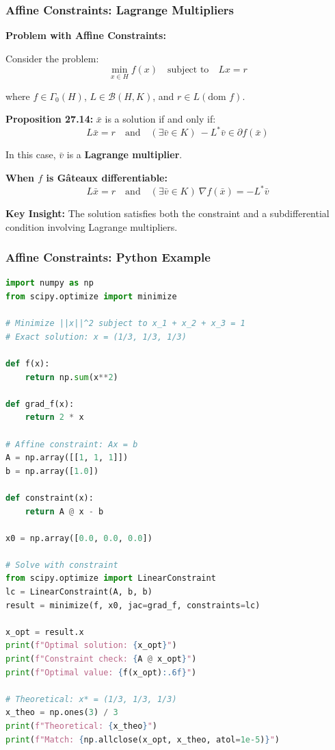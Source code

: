 \documentclass[aspectratio=169,10pt]{beamer}
\begin{document}
\begin{frame}[allowframebreaks]
\frametitle{Affine Constraints: Lagrange Multipliers}

\textbf{Problem with Affine Constraints:}

Consider the problem:
\[\min_{x \in H} f(x) \quad \text{subject to} \quad Lx = r\]

where $f \in \Gamma_0(H)$, $L \in \mathcal{B}(H, K)$, and $r \in L(\text{dom } f)$.

\vspace{0.3cm}

\textbf{Proposition 27.14:} $\bar{x}$ is a solution if and only if:
\[L\bar{x} = r \quad \text{and} \quad (\exists \bar{v} \in K)\ -L^*\bar{v} \in \partial f(\bar{x})\]

In this case, $\bar{v}$ is a \textbf{Lagrange multiplier}.

\vspace{0.3cm}

\textbf{When $f$ is Gâteaux differentiable:}
\[L\bar{x} = r \quad \text{and} \quad (\exists \bar{v} \in K)\ \nabla f(\bar{x}) = -L^*\bar{v}\]

\vspace{0.3cm}

\textbf{Key Insight:}
The solution satisfies both the constraint and a subdifferential condition involving Lagrange multipliers.

\end{frame}

\begin{frame}[fragile]
\frametitle{Affine Constraints: Python Example}

\begin{lstlisting}[language=Python]
import numpy as np
from scipy.optimize import minimize

# Minimize ||x||^2 subject to x_1 + x_2 + x_3 = 1
# Exact solution: x = (1/3, 1/3, 1/3)

def f(x):
    return np.sum(x**2)

def grad_f(x):
    return 2 * x

# Affine constraint: Ax = b
A = np.array([[1, 1, 1]])
b = np.array([1.0])

def constraint(x):
    return A @ x - b

x0 = np.array([0.0, 0.0, 0.0])

# Solve with constraint
from scipy.optimize import LinearConstraint
lc = LinearConstraint(A, b, b)
result = minimize(f, x0, jac=grad_f, constraints=lc)

x_opt = result.x
print(f"Optimal solution: {x_opt}")
print(f"Constraint check: {A @ x_opt}")
print(f"Optimal value: {f(x_opt):.6f}")

# Theoretical: x* = (1/3, 1/3, 1/3)
x_theo = np.ones(3) / 3
print(f"Theoretical: {x_theo}")
print(f"Match: {np.allclose(x_opt, x_theo, atol=1e-5)}")
\end{lstlisting}

\end{frame}
\end{document}
